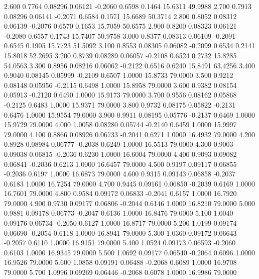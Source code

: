    2.600   0.7764   0.08296   0.06121  -0.2060   0.6598   0.1464  15.6311  49.9988
   2.700   0.7913   0.08296   0.06141  -0.2071   0.6584   0.1571  15.6689  50.3714
   2.800   0.8052   0.08312   0.06139  -0.2076   0.6570   0.1653  15.7059  50.6575
   2.900   0.8200   0.08323   0.06121  -0.2080   0.6557   0.1743  15.7407  50.9758
   3.000   0.8377   0.08313   0.06109  -0.2091   0.6545   0.1905  15.7723  51.5092
   3.100   0.8553   0.08305   0.06082  -0.2099   0.6534   0.2141  15.8018  52.2695
   3.200   0.8739   0.08289   0.06057  -0.2108   0.6524   0.2732  15.8285  54.0563
   3.300   0.8956   0.08216   0.06062  -0.2122   0.6516   0.6240  15.8491  63.4256
   3.400   0.9040   0.08145   0.05999  -0.2109   0.6507   1.0000  15.8733  79.0000
   3.500   0.9212   0.08148   0.05956  -0.2115   0.6498   1.0000  15.8958  79.0000
   3.600   0.9382   0.08154   0.05913  -0.2120   0.6490   1.0000  15.9173  79.0000
   3.700   0.9556   0.08162   0.05868  -0.2125   0.6483   1.0000  15.9371  79.0000
   3.800   0.9732   0.08175   0.05822  -0.2131   0.6476   1.0000  15.9554  79.0000
   3.900   0.9911   0.08195   0.05776  -0.2137   0.6469   1.0000  15.9729  79.0000
   4.000   1.0058   0.08280   0.05744  -0.2140   0.6459   1.0000  15.9997  79.0000
   4.100   0.8866   0.08926   0.06733  -0.2041   0.6271   1.0000  16.4932  79.0000
   4.200   0.8928   0.08984   0.06777  -0.2038   0.6249   1.0000  16.5513  79.0000
   4.300   0.9003   0.09038   0.06815  -0.2036   0.6230   1.0000  16.6004  79.0000
   4.400   0.9093   0.09082   0.06841  -0.2036   0.6213   1.0000  16.6457  79.0000
   4.500   0.9197   0.09117   0.06855  -0.2036   0.6197   1.0000  16.6873  79.0000
   4.600   0.9315   0.09143   0.06858  -0.2037   0.6183   1.0000  16.7254  79.0000
   4.700   0.9445   0.09161   0.06850  -0.2039   0.6169   1.0000  16.7601  79.0000
   4.800   0.9584   0.09172   0.06833  -0.2041   0.6157   1.0000  16.7920  79.0000
   4.900   0.9730   0.09177   0.06806  -0.2044   0.6146   1.0000  16.8210  79.0000
   5.000   0.9881   0.09178   0.06773  -0.2047   0.6136   1.0000  16.8476  79.0000
   5.100   1.0040   0.09176   0.06734  -0.2050   0.6127   1.0000  16.8717  79.0000
   5.200   1.0199   0.09174   0.06690  -0.2054   0.6118   1.0000  16.8941  79.0000
   5.300   1.0360   0.09172   0.06643  -0.2057   0.6110   1.0000  16.9151  79.0000
   5.400   1.0524   0.09173   0.06593  -0.2060   0.6103   1.0000  16.9345  79.0000
   5.500   1.0692   0.09177   0.06540  -0.2064   0.6096   1.0000  16.9526  79.0000
   5.600   1.0858   0.09191   0.06488  -0.2068   0.6089   1.0000  16.9708  79.0000
   5.700   1.0996   0.09269   0.06446  -0.2068   0.6078   1.0000  16.9986  79.0000
